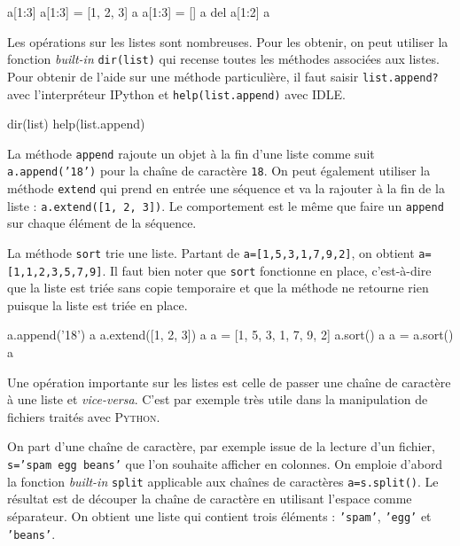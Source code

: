 \begin{idleconsole}
\begin{pyconsole}
a[1:3]
a[1:3] = [1, 2, 3]
a
a[1:3] = []
a
del a[1:2]
a
\end{pyconsole}
\end{idleconsole}

Les opérations sur les listes sont nombreuses. Pour les obtenir, on peut utiliser la fonction \textit{built-in} \texttt{dir(list)} qui recense toutes les méthodes associées aux listes. Pour obtenir de l'aide sur une méthode particulière, il faut saisir \texttt{list.append?} avec l'interpréteur IPython et \texttt{help(list.append)} avec IDLE.

\begin{idleconsole*}
\begin{pyconsole}[][breaklines]
dir(list)
help(list.append)
\end{pyconsole}
\end{idleconsole*}

La méthode \texttt{append} rajoute un objet à la fin d'une liste comme suit \texttt{a.append('18')} pour la chaîne de caractère \texttt{18}. On peut également utiliser la méthode \texttt{extend} qui prend en entrée une séquence et va la rajouter à la fin de la liste : \texttt{a.extend([1, 2, 3])}. Le comportement est le même que faire un \texttt{append} sur chaque élément de la séquence.

La méthode \texttt{sort} trie une liste. Partant de \texttt{a=[1,5,3,1,7,9,2]}, on obtient \texttt{a=[1,1,2,3,5,7,9]}. Il faut bien noter que \texttt{sort} fonctionne en place, c'est-à-dire que la liste est triée sans copie temporaire et que la méthode ne retourne rien puisque la liste est triée en place.

\begin{idleconsole}
\begin{pyconsole}
a.append('18')
a
a.extend([1, 2, 3])
a
a = [1, 5, 3, 1, 7, 9, 2]
a.sort()
a
a = a.sort()
a
\end{pyconsole}
\end{idleconsole}

Une opération importante sur les listes est celle de passer une chaî\-ne de caractère à une liste et \textit{vice-versa}. C'est par exemple très utile dans la manipulation de fichiers traités avec \textsc{Python}.

On part d'une chaîne de caractère, par exemple issue de la lecture d'un fichier, \texttt{s='spam egg beans'} que l'on souhaite afficher en colonnes. On emploie d'abord la fonction \textit{built-in} \texttt{split} applicable aux chaînes de caractères \texttt{a=s.split()}. Le résultat est de découper la chaîne de caractère en utilisant l'espace comme séparateur. On obtient une liste qui contient trois éléments : \texttt{'spam'}, \texttt{'egg'} et \texttt{'beans'}.

